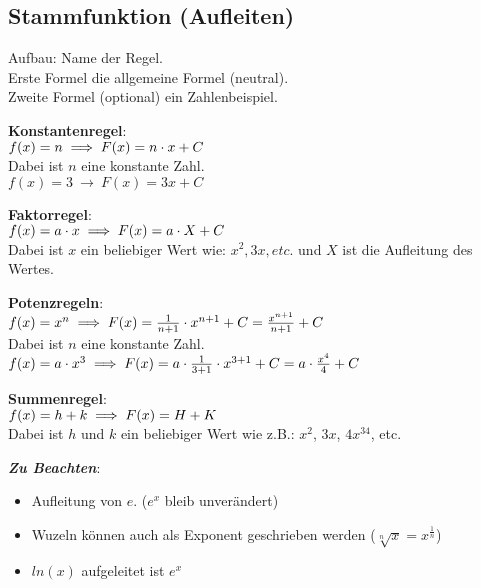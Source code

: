 \subsection{Stammfunktion (Aufleiten)}
\label{sec:aufleitungs_regeln}

Aufbau: Name der Regel. \\
Erste Formel die allgemeine Formel (neutral). \\
Zweite Formel (optional) ein Zahlenbeispiel. 

\setlength{\columnsep}{24pt}
\begin{multicols}{2}

\textbf{Konstantenregel}: \\
$f(x) = n \\
\implies F(x) = n\cdot x + C$ \\
Dabei ist $n$ eine konstante Zahl. \\
$f(x) = 3\ \rightarrow\ F(x) = 3x + C$ 

\textbf{Faktorregel}: \\
$f(x) = a\cdot x \\
\implies F(x) = a\cdot X + C$ \\
Dabei ist $x$ ein beliebiger Wert wie: $x^2, 3x, etc.$ und $X$ ist die Aufleitung des Wertes. 

\columnbreak

\textbf{Potenzregeln}: \\
$f(x) = x^n\ \\ 
\implies F(x) = \frac{1}{n + 1}\cdot x^{n + 1} + C = \frac{x^{n+1}}{n+1} + C$\\
Dabei ist $n$ eine konstante Zahl. \\
$f(x) = a\cdot x^3\ \\ 
\implies F(x) = a\cdot \frac{1}{3 + 1}\cdot x^{3 + 1} + C= a\cdot \frac{x^{4}}{4} + C$ 

\textbf{Summenregel}: \\
$f(x) = h + k \\
\implies F(x) = H + K$ \\
Dabei ist $h$ und $k$ ein beliebiger Wert wie z.B.: $x^2$, $3x$, $4x^34$, etc. 

\end{multicols}

\textit{\textbf{Zu Beachten}}:
\begin{itemize}
    \item Aufleitung von $e$. ($e^x$ bleib unverändert)
    \item Wuzeln können auch als Exponent geschrieben werden ($\sqrt[n]{x} = x^{\frac{1}{n}}$)
    \item $ln(x)$ aufgeleitet ist $e^x$
\end{itemize}
